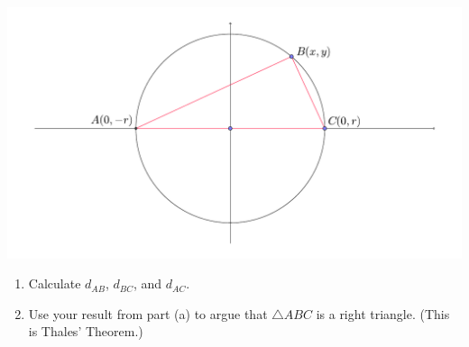 \documentclass[12pt]{article}
\newif\ifans
\begin{document}
\begin{enumerate}
\begin{center}
\includegraphics[scale=0.5]{circle.pdf}
\end{center}

\begin{enumerate}

\item Calculate $d_{AB}$, $d_{BC}$, and $d_{AC}$.  

\ifans{\fbox{\parbox{1\linewidth}{Using the distance formula, we calculate the required lengths:
\begin{itemize}
\item $d_{AB}=\sqrt{(x-0)^2+(y+r)^2}=\sqrt{x^2+(y+r)^2}$
\item $d_{BC}=\sqrt{(0-x)^2+(r-y)^2}=\sqrt{x^2+(r-y)^2}$
\item $d_{AC}=2r$
\end{itemize}}}} \fi

\item Use your result from part (a) to argue that $\triangle ABC$ is a right triangle.  (This is Thales' Theorem.)

\ifans{\fbox{\parbox{1\linewidth}{We will show that $(d_{BC})^2+(d_{AB})^2=(d_{AC})^2$.  At some point in our calculation, we will use the fact that the circle has equation $x^2+y^2=r^2$.
\begin{align*}
(d_{BC})^2+(d_{AB})^2 &=\left(\sqrt{x^2+(r-y)^2}\right)^2+\left(\sqrt{x^2+(y+r)^2}\right)\\
&=x^2+(r-y)^2+x^2+(y+r)^2\\
&=x^2+r^2-2ry+y^2++x^2 +y^2+2ry+r^2\\
&=2(x^2+y^2)+2r^2\\
&=2r^2+2r^2 \\
&=4r^2\\
&=(d_{AC})^2
\end{align*}
Thus, since the Pythagorean Theorem is satisfied, $\triangle ABC$ is a right triangle.
}}} \fi


\end{enumerate}
\end{enumerate}
\end{document}
